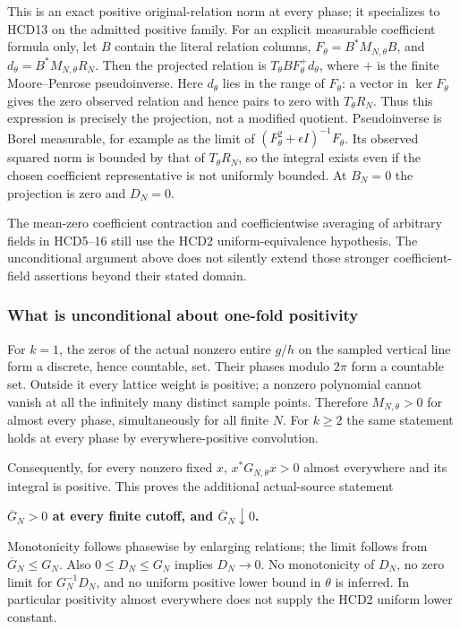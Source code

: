 \documentclass{article}
\begin{document}
This is an exact positive original-relation norm at every phase; it specializes to HCD13 on the admitted positive family. For an explicit measurable coefficient formula only, let \(B\) contain the literal relation columns, \(F_\theta=B^*M_{N,\theta}B\), and \(d_\theta=B^*M_{N,\theta}R_N\). Then the projected relation is \(T_\theta BF_\theta^+d_\theta\), where \(+\) is the finite Moore--Penrose pseudoinverse. Here \(d_\theta\) lies in the range of \(F_\theta\): a vector in \(\ker F_\theta\) gives the zero observed relation and hence pairs to zero with \(T_\theta R_N\). Thus this expression is precisely the projection, not a modified quotient. Pseudoinverse is Borel measurable, for example as the limit of \((F_\theta^2+\epsilon I)^{-1}F_\theta\). Its observed squared norm is bounded by that of \(T_\theta R_N\), so the integral exists even if the chosen coefficient representative is not uniformly bounded. At \(B_N=0\) the projection is zero and \(D_N=0\).

The mean-zero coefficient contraction and coefficientwise averaging of arbitrary fields in HCD5--16 still use the HCD2 uniform-equivalence hypothesis. The unconditional argument above does not silently extend those stronger coefficient-field assertions beyond their stated domain.

\subsubsection{What is unconditional about one-fold positivity}\label{what-is-unconditional-about-one-fold-positivity}

For \(k=1\), the zeros of the actual nonzero entire \(g/h\) on the sampled vertical line form a discrete, hence countable, set. Their phases modulo \(2\pi\) form a countable set. Outside it every lattice weight is positive; a nonzero polynomial cannot vanish at all the infinitely many distinct sample points. Therefore \(M_{N,\theta}>0\) for almost every phase, simultaneously for all finite \(N\). For \(k\ge2\) the same statement holds at every phase by everywhere-positive convolution.

Consequently, for every nonzero fixed \(x\), \(x^*G_{N,\theta}x>0\) almost everywhere and its integral is positive. This proves the additional actual-source statement

\textbf{\(\overline G_N>0\) at every finite cutoff, and \(\overline G_N\downarrow0\).}

Monotonicity follows phasewise by enlarging relations; the limit follows from \(\overline G_N\le G_N\). Also \(0\le D_N\le G_N\) implies \(D_N\longrightarrow0\). No monotonicity of \(D_N\), no zero limit for \(G_N^{-1}D_N\), and no uniform positive lower bound in \(\theta\) is inferred. In particular positivity almost everywhere does not supply the HCD2 uniform lower constant.
\end{document}
